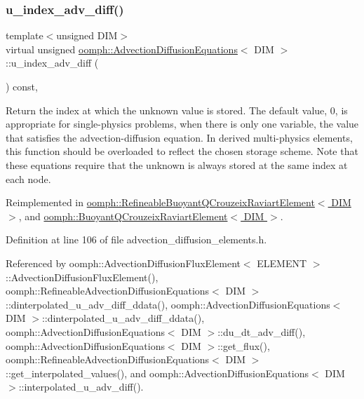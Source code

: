 \subsubsection{\texorpdfstring{u\+\_\+index\+\_\+adv\+\_\+diff()}{u\_index\_adv\_diff()}}
{\footnotesize\ttfamily template$<$unsigned D\+IM$>$ \\
virtual unsigned \hyperlink{classoomph_1_1AdvectionDiffusionEquations}{oomph\+::\+Advection\+Diffusion\+Equations}$<$ D\+IM $>$\+::u\+\_\+index\+\_\+adv\+\_\+diff (\begin{DoxyParamCaption}{ }\end{DoxyParamCaption}) const\hspace{0.3cm}{\ttfamily [inline]}, {\ttfamily [virtual]}}



Return the index at which the unknown value is stored. The default value, 0, is appropriate for single-\/physics problems, when there is only one variable, the value that satisfies the advection-\/diffusion equation. In derived multi-\/physics elements, this function should be overloaded to reflect the chosen storage scheme. Note that these equations require that the unknown is always stored at the same index at each node. 



Reimplemented in \hyperlink{classoomph_1_1RefineableBuoyantQCrouzeixRaviartElement_ac6a973ee5e4d7425db2e7f9a259bab46}{oomph\+::\+Refineable\+Buoyant\+Q\+Crouzeix\+Raviart\+Element$<$ D\+I\+M $>$}, and \hyperlink{classoomph_1_1BuoyantQCrouzeixRaviartElement_acf5fa44f694c5374c61a964020437bf4}{oomph\+::\+Buoyant\+Q\+Crouzeix\+Raviart\+Element$<$ D\+I\+M $>$}.



Definition at line 106 of file advection\+\_\+diffusion\+\_\+elements.\+h.



Referenced by oomph\+::\+Advection\+Diffusion\+Flux\+Element$<$ E\+L\+E\+M\+E\+N\+T $>$\+::\+Advection\+Diffusion\+Flux\+Element(), oomph\+::\+Refineable\+Advection\+Diffusion\+Equations$<$ D\+I\+M $>$\+::dinterpolated\+\_\+u\+\_\+adv\+\_\+diff\+\_\+ddata(), oomph\+::\+Advection\+Diffusion\+Equations$<$ D\+I\+M $>$\+::dinterpolated\+\_\+u\+\_\+adv\+\_\+diff\+\_\+ddata(), oomph\+::\+Advection\+Diffusion\+Equations$<$ D\+I\+M $>$\+::du\+\_\+dt\+\_\+adv\+\_\+diff(), oomph\+::\+Advection\+Diffusion\+Equations$<$ D\+I\+M $>$\+::get\+\_\+flux(), oomph\+::\+Refineable\+Advection\+Diffusion\+Equations$<$ D\+I\+M $>$\+::get\+\_\+interpolated\+\_\+values(), and oomph\+::\+Advection\+Diffusion\+Equations$<$ D\+I\+M $>$\+::interpolated\+\_\+u\+\_\+adv\+\_\+diff().

